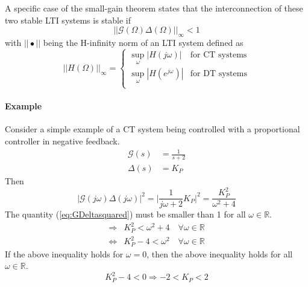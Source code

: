 A specific case of the small-gain theorem \cite{control_theory_ljung} states that the interconnection of these two stable LTI systems is stable if 
\begin{equation}
||\mathcal{G}(\Omega)\Delta(\Omega)||_\infty < 1
\end{equation}
with $||\bullet||$ being the H-infinity norm of an LTI system defined as
\begin{equation*}
	||H(\Omega)||_\infty = \begin{cases}
		\sup_\omega |H(j\omega)| & \text{for CT systems} \\
		\sup_\omega |H(e^{j\omega})| & \text{for DT systems} \\
	\end{cases}
\end{equation*}

\paragraph{Example}
Consider a simple example of a CT system being controlled with a proportional controller in negative feedback. 
\begin{align*}
\mathcal{G}(s) &= \frac{1}{s+2}\\
\Delta(s) &= K_P
\end{align*}
Then
\begin{equation}
|\mathcal{G}(j\omega)\Delta(j\omega)|^2 = \Big|\frac{1}{j\omega+2}K_P\Big|^2 = \frac{K_P^2}{\omega^2 + 4}
\label{eq:GDeltasquared}
\end{equation}
The quantity (\ref{eq:GDeltasquared}) must be smaller than 1 for all $\omega \in \mathds{R}$.
\begin{align*}
\Rightarrow &K_P^2 < \omega^2 + 4 \quad \forall \omega \in \mathds{R} \\
\Leftrightarrow  & K_P^2-4 < \omega^2 \quad \forall \omega \in \mathds{R}
\end{align*}
If the above inequality holds for $\omega = 0$, then the above inequality holds for all $\omega \in \mathds{R}$.
\begin{equation}
K_P^2-4 < 0 \Rightarrow \boxed{-2 < K_P < 2}
\label{eq:Kpboundssmallgain}
\end{equation}

